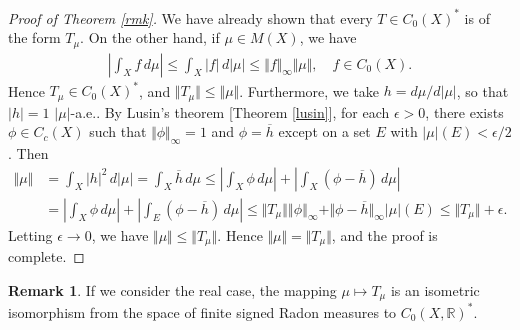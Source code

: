 \documentclass{article}
\numberwithin{equation}{section}
\newcommand{\bbR}{\mathbb{R}}
\newcommand{\ol}{\overline}
\theoremstyle{plain}
\theoremstyle{definition}
\newtheorem*{remark}{Remark}
\begin{document}
\begin{proof}[Proof of Theorem \ref{rmk}]
	We have already shown that every $T\in C_0(X)^*$ is of the form $T_\mu$. On the other hand, if $\mu\in M(X)$, we have
	\begin{align*}
		\left\vert\int_X f\,d\mu\right\vert\leq\int_X\vert f\vert\,d\vert\mu\vert\leq\Vert f\Vert_\infty\Vert\mu\Vert,\quad f\in C_0(X).
	\end{align*}
	Hence $T_\mu\in C_0(X)^*$, and $\Vert T_\mu\Vert\leq\Vert \mu\Vert$. Furthermore, we take $h=d\mu/d\vert\mu\vert$, so that $\vert h\vert=1$ $\vert\mu\vert$-a.e.. By Lusin's theorem [Theorem \ref{lusin}], for each $\epsilon>0$, there exists $\phi\in C_c(X)$ such that $\Vert\phi\Vert_\infty=1$ and $\phi=\ol{h}$ except on a set $E$ with $\vert\mu\vert(E)<\epsilon/2$. Then
	\begin{align*}
		\Vert\mu\Vert&=\int_X\vert h\vert^2\,d\vert\mu\vert=\int_X\ol{h}\,d\mu\leq\left\vert\int_X \phi\,d\mu\right\vert+\left\vert\int_X(\phi-\ol{h})\,d\mu\right\vert\\
		&=\left\vert\int_X \phi\,d\mu\right\vert+\left\vert\int_E(\phi-\ol{h})\,d\mu\right\vert\leq\Vert T_\mu\Vert\left\Vert\phi\right\Vert_\infty+\Vert\phi-\ol{h}\Vert_\infty\vert\mu\vert(E)\leq\Vert T_\mu\Vert+\epsilon.
	\end{align*}
	Letting $\epsilon\to 0$, we have $\Vert\mu\Vert\leq\Vert T_\mu\Vert$. Hence $\Vert\mu\Vert=\Vert T_\mu\Vert$, and the proof is complete.
\end{proof}
\begin{remark}
If we consider the real case, the mapping $\mu\mapsto T_\mu$ is an isometric isomorphism from the space of finite signed Radon measures to $C_0(X,\bbR)^*$.
\end{remark} 
\end{document}
